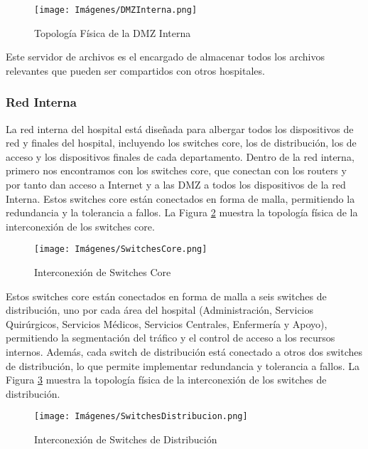 \begin{figure}[H]
    \centering
    \texttt{[image: Imágenes/DMZInterna.png]}
    \caption{Topología Física de la DMZ Interna}
    \label{fig:DMZInterna}
\end{figure}

Este servidor de archivos es el encargado de almacenar todos los archivos relevantes que pueden ser compartidos con otros hospitales.

\subsubsection{Red Interna}
La red interna del hospital está diseñada para albergar todos los dispositivos de red y finales del hospital, incluyendo los switches core, los de distribución, los de acceso y los dispositivos finales 
de cada departamento. Dentro de la red interna, primero nos encontramos con los switches core, que conectan con los routers y por tanto dan acceso a Internet y a las DMZ a todos los dispositivos de la red Interna.
Estos switches core están conectados en forma de malla, permitiendo la redundancia y la tolerancia a fallos. La Figura \ref{fig:SwitchesCore} muestra la topología física de la interconexión de los switches core.

\begin{figure}[H]
    \centering
    \texttt{[image: Imágenes/SwitchesCore.png]}
    \caption{Interconexión de Switches Core}
    \label{fig:SwitchesCore}
\end{figure}

Estos switches core están conectados en forma de malla a seis switches de distribución, uno por cada área del hospital (Administración, Servicios Quirúrgicos, Servicios Médicos, Servicios Centrales, Enfermería y Apoyo), 
permitiendo la segmentación del tráfico y el control de acceso a los recursos internos. Además, cada switch de distribución está conectado a otros dos switches de distribución, 
lo que permite implementar redundancia y tolerancia a fallos. La Figura \ref{fig:SwitchesDistribucion} muestra la topología física de la interconexión de los switches de distribución.

\begin{figure}[H]
    \centering
    \texttt{[image: Imágenes/SwitchesDistribucion.png]}
    \caption{Interconexión de Switches de Distribución}
    \label{fig:SwitchesDistribucion}
\end{figure}

